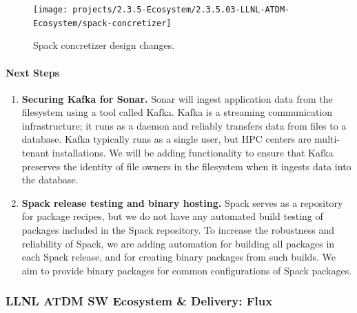 \begin{figure}[htb]
    \centering
    \texttt{[image: projects/2.3.5-Ecosystem/2.3.5.03-LLNL-ATDM-Ecosystem/spack-concretizer]}
    \caption{\label{fig:concretize}
        Spack concretizer design changes.
    }
\end{figure}


\paragraph{Next Steps}
\begin{enumerate}

    \item {\bf Securing Kafka for Sonar.}  Sonar will ingest application
    data from the filesystem using a tool called Kafka. Kafka is a
    streaming communication infrastructure; it runs as a daemon and
    reliably transfers data from files to a database.  Kafka typically
    runs as a single user, but HPC centers are multi-tenant
    installations.  We will be adding functionality to ensure that Kafka
    preserves the identity of file owners in the filesystem when it
    ingests data into the database.

    \item {\bf Spack release testing and binary hosting.} Spack serves as
    a repository for package recipes, but we do not have any automated
    build testing of packages included in the Spack repository.  To
    increase the robustness and reliability of Spack, we are adding
    automation for building all packages in each Spack release, and for
    creating binary packages from such builds. We aim to provide binary
    packages for common configurations of Spack packages.
\end{enumerate}

\newpage 
\subsubsection{ LLNL ATDM SW Ecosystem \& Delivery: Flux}


